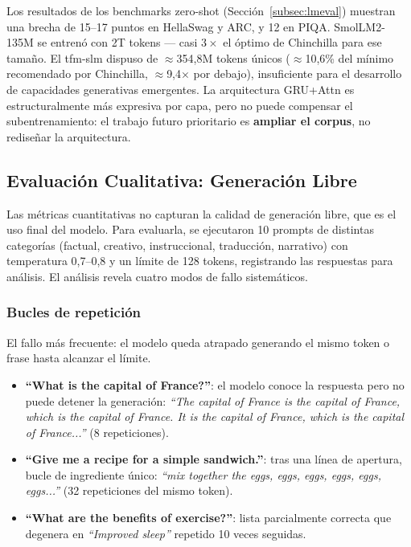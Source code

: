 Los resultados de los benchmarks zero-shot (Sección~\ref{subsec:lmeval}) muestran una brecha de 15--17 puntos en HellaSwag y ARC, y 12 en PIQA. SmolLM2-135M se entrenó con 2T tokens --- casi $3\times$ el óptimo de Chinchilla para ese tamaño. El tfm-slm dispuso de $\approx$354,8M tokens únicos ($\approx$10,6\% del mínimo recomendado por Chinchilla, $\approx$9,4$\times$ por debajo), insuficiente para el desarrollo de capacidades generativas emergentes. La arquitectura GRU+Attn es estructuralmente más expresiva por capa, pero no puede compensar el sub\-en\-tren\-a\-mien\-to: el trabajo futuro prioritario es \textbf{ampliar el corpus}, no rediseñar la arquitectura.

\subsection{Evaluación Cualitativa: Generación Libre}
\label{subsec:qualitative}

Las métricas cuantitativas no capturan la calidad de generación libre, que es el uso final del modelo. Para evaluarla, se ejecutaron 10 prompts de distintas categorías (factual, creativo, instruccional, traducción, narrativo) con temperatura 0,7--0,8 y un límite de 128 tokens, registrando las respuestas para análisis. El análisis revela cuatro modos de fallo sistemáticos.

\subsubsection*{Bucles de repetición}

El fallo más frecuente: el modelo queda atrapado generando el mismo token o frase hasta alcanzar el límite.

\begin{itemize}
    \item \textbf{``What is the capital of France?''}: el modelo conoce la respuesta pero no puede detener la generación: \textit{``The capital of France is the capital of France, which is the capital of France. It is the capital of France, which is the capital of France...''} (8 repeticiones).
    \item \textbf{``Give me a recipe for a simple sandwich.''}: tras una línea de apertura, bucle de ingrediente único: \textit{``mix together the eggs, eggs, eggs, eggs, eggs, eggs...''} (32 repeticiones del mismo token).
    \item \textbf{``What are the benefits of exercise?''}: lista parcialmente correcta que degenera en \textit{``Improved sleep''} repetido 10 veces seguidas.
\end{itemize}


